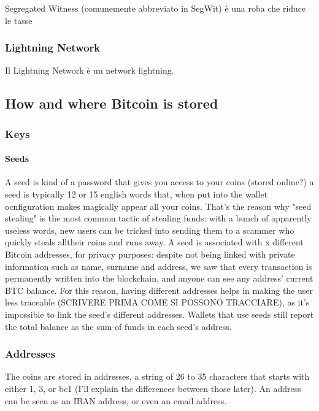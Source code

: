 \documentclass {article}
\begin{document}
Segregated Witness (comunemente abbreviato in SegWit) è una roba che riduce le tasse


\subsubsection {Lightning Network}


Il Lightning Network è un network lightning.


\subsection {How and where Bitcoin is stored}


\subsubsection {Keys}


\paragraph {Seeds}


A seed is kind of a password that gives you access to your coins (stored online?) a seed is typically 12 or 15 english words that, when put into the wallet ocnfiguration makes magically appear all your coins.
That's the reason why "seed stealing" is the most common tactic of stealing funds: with a bunch of apparently useless words, new users can be tricked into sending them to a scammer who quickly steals alltheir coins and runs away.
A seed is associated with x different Bitcoin addresses, for privacy purposes: despite not being linked with private information such as name, surname and address, we saw that every transaction is permanently written into the blockchain, and anyone can see any address' current BTC balance.
For this reason, having different addresses helps in making the user less traceable (SCRIVERE PRIMA COME SI POSSONO TRACCIARE), as it's impossible to link the seed's different addresses.
Wallets that use seeds still report the total balance as the sum of funds in each seed's address.


\subsubsection {Addresses}


The coins are stored in addresses, a string of 26 to 35 characters that starts with either 1, 3, or bc1 (I'll explain the differences between those later). An address can be seen as an IBAN address, or even an email address.
\end{document}
